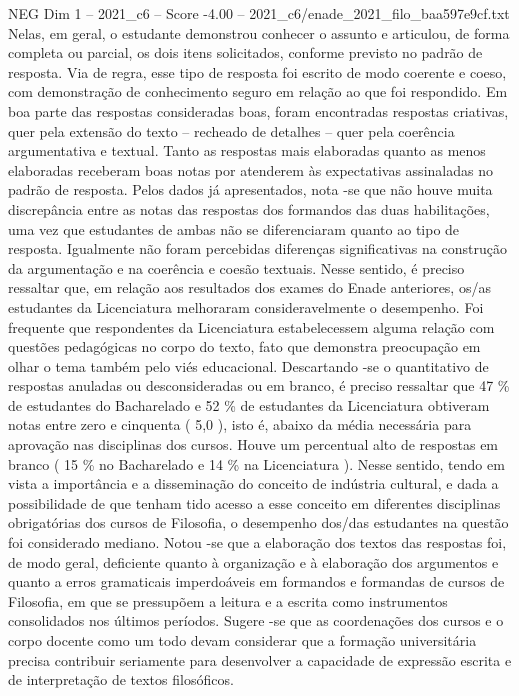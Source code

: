 \begin{textsample}{NEG Dim 1 – 2021\_c6 – Score -4.00 – 2021\_c6/enade\_2021\_filo\_baa597e9cf.txt}
Nelas, em geral, o estudante demonstrou conhecer o assunto e articulou, de forma completa ou parcial, os dois itens solicitados, conforme previsto no padrão de resposta.
Via de regra, esse tipo de resposta foi escrito de modo coerente e coeso, com demonstração de conhecimento seguro em relação ao que foi respondido.
Em boa parte das respostas consideradas boas, foram encontradas respostas criativas, quer pela extensão do texto – recheado de detalhes – quer pela coerência argumentativa e textual.
Tanto as respostas mais elaboradas quanto as menos elaboradas receberam boas notas por atenderem às expectativas assinaladas no padrão de resposta.
Pelos dados já apresentados, nota -se que não houve muita discrepância entre as notas das respostas dos formandos das duas habilitações, uma vez que estudantes de ambas não se diferenciaram quanto ao tipo de resposta.
Igualmente não foram percebidas diferenças significativas na construção da argumentação e na coerência e coesão textuais.
Nesse sentido, é preciso ressaltar que, em relação aos resultados dos exames do Enade anteriores, os/as estudantes da Licenciatura melhoraram consideravelmente o desempenho.
Foi frequente que respondentes da Licenciatura estabelecessem alguma relação com questões pedagógicas no corpo do texto, fato que demonstra preocupação em olhar o tema também pelo viés educacional.
Descartando -se o quantitativo de respostas anuladas ou desconsideradas ou em branco, é preciso ressaltar que 47 \% de estudantes do Bacharelado e 52 \% de estudantes da Licenciatura obtiveram notas entre zero e cinquenta ( 5,0 ), isto é, abaixo da média necessária para aprovação nas disciplinas dos cursos.
Houve um percentual alto de respostas em branco ( 15 \% no Bacharelado e 14 \% na Licenciatura ).
Nesse sentido, tendo em vista a importância e a disseminação do conceito de indústria cultural, e dada a possibilidade de que tenham tido acesso a esse conceito em diferentes disciplinas obrigatórias dos cursos de Filosofia, o desempenho dos/das estudantes na questão foi considerado mediano.
Notou -se que a elaboração dos textos das respostas foi, de modo geral, deficiente quanto à organização e à elaboração dos argumentos e quanto a erros gramaticais imperdoáveis em formandos e formandas de cursos de Filosofia, em que se pressupõem a leitura e a escrita como instrumentos consolidados nos últimos períodos.
Sugere -se que as coordenações dos cursos e o corpo docente como um todo devam considerar que a formação universitária precisa contribuir seriamente para desenvolver a capacidade de expressão escrita e de interpretação de textos filosóficos.

\end{textsample}
